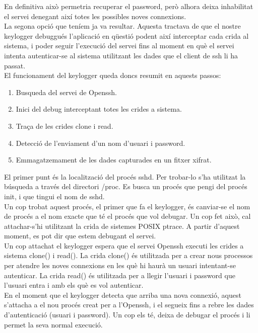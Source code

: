 En definitiva això permetria recuperar el password, però alhora deixa inhabilitat el servei denegant així 
totes les possibles noves connexions. \\

La segona opció que teníem ja va resultar. Aquesta tractava de que el nostre keylogger debuggués l'aplicació
en qüestió podent així interceptar cada crida al sistema, i poder seguir l'execució del servei fins al moment
en què el servei intenta autenticar-se al sistema utilitzant les dades que el client de ssh li ha passat. \\

El funcionament del keylogger queda doncs resumit en aquests passos:
\begin{enumerate}
\item Busqueda del servei de Openssh.
\item Inici del debug interceptant totes les crides a sistema.
\item Traça de les crides clone i read.
\item Detecció de l'enviament d'un nom d'usuari i password.
\item Emmagatzemament de les dades capturades en un fitxer xifrat.
\end{enumerate}

El primer punt és la localització del procés sshd. Per trobar-lo s'ha utilitzat la búsqueda a través del
directori /proc. Es busca un procés que pengi del procés init, i que tingui el nom de sshd. \\

Un cop trobat aquest procés, el primer que fa el keylogger, és canviar-se el nom de procés a el nom 
exacte que té el procés que vol debugar. Un cop fet això, cal attachar-s'hi utilitzant la crida de sistemes 
POSIX ptrace. A partir d'aquest moment, es pot dir que estem debugant el servei. \\

Un cop attachat el keylogger espera que el servei Openssh executi les crides a sistema clone() i read().
La crida clone() és utilitzada per a crear nous processos per atendre les noves connexions en les què
hi haurà un usuari intentant-se autenticar. La crida read() és utilitzada per a llegir l'usuari i password
que l'usuari entra i amb els què es vol autenticar. \\

En el moment que el keylogger detecta que arriba una nova connexió, aquest s'attacha a el nou procés creat
per a l'Openssh, i el segueix fins a rebre les dades d'autenticació (usuari i password). Un cop els té,
deixa de debugar el procés i li permet la seva normal execució. \\

